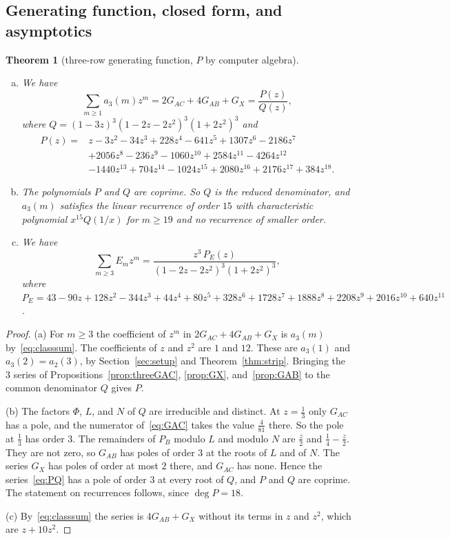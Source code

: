 \documentclass[12pt]{article}
\theoremstyle{plain}
\newtheorem{theorem}{Theorem}
\theoremstyle{definition}
\theoremstyle{remark}
\begin{document}
\subsection{Generating function, closed form, and asymptotics}

\begin{theorem}[three-row generating function, $P$ by computer algebra]\label{thm:threegf}
\leavevmode
\begin{enumerate}[(a)]
\item We have
\begin{equation}\label{eq:PQ}
\sum_{m\ge1}a_3(m)z^m=2G_{AC}+4G_{AB}+G_X=\frac{P(z)}{Q(z)},
\end{equation}
where $Q=(1-3z)^3(1-2z-2z^2)^3(1+2z^2)^3$ and
\begin{align*}
P(z)={}&z-3z^2-34z^3+228z^4-641z^5+1307z^6-2186z^7\\
&+2056z^8-236z^9-1060z^{10}+2584z^{11}-4264z^{12}\\
&-1440z^{13}+704z^{14}-1024z^{15}+2080z^{16}+2176z^{17}+384z^{18}.
\end{align*}
\item The polynomials $P$ and $Q$ are coprime. So $Q$ is the reduced denominator,
and $a_3(m)$ satisfies the linear recurrence of order $15$ with characteristic
polynomial $x^{15}Q(1/x)$ for $m\ge19$ and no recurrence of smaller order.
\item We have
\[
\sum_{m\ge3}E_mz^m=\frac{z^3\,P_E(z)}{(1-2z-2z^2)^3(1+2z^2)^3},
\]
where $P_E=43-90z+128z^2-344z^3+44z^4+80z^5+328z^6+1728z^7+1888z^8+2208z^9
+2016z^{10}+640z^{11}$.
\end{enumerate}
\end{theorem}

\begin{proof}
(a) For $m\ge3$ the coefficient of $z^m$ in $2G_{AC}+4G_{AB}+G_X$ is $a_3(m)$
by~\eqref{eq:classsum}. The coefficients of $z$ and $z^2$ are $1$ and $12$.
These are $a_3(1)$ and $a_3(2)=a_2(3)$, by Section~\ref{sec:setup} and
Theorem~\ref{thm:strip}. Bringing the $3$ series of
Propositions~\ref{prop:threeGAC}, \ref{prop:GX}, and~\ref{prop:GAB} to the common
denominator $Q$ gives $P$.

(b) The factors $\Phi$, $L$, and $N$ of $Q$ are irreducible and distinct. At
$z=\frac13$ only $G_{AC}$ has a pole, and the numerator of~\eqref{eq:GAC} takes
the value $\frac4{81}$ there. So the pole at $\frac13$ has order $3$. The remainders of
$P_B$ modulo $L$ and modulo $N$ are $\frac z2$ and $\frac14-\frac z2$. They are
not zero, so $G_{AB}$ has poles of order $3$ at the roots of $L$ and of $N$.
The series $G_X$ has poles of order at most $2$ there, and $G_{AC}$ has none.
Hence the series~\eqref{eq:PQ} has a pole of order $3$ at every root of $Q$, and
$P$ and $Q$ are coprime. The statement on recurrences follows, since
$\deg P=18$.

(c) By~\eqref{eq:classsum} the series is $4G_{AB}+G_X$ without its terms in
$z$ and $z^2$, which are $z+10z^2$.
\end{proof}
\end{document}

